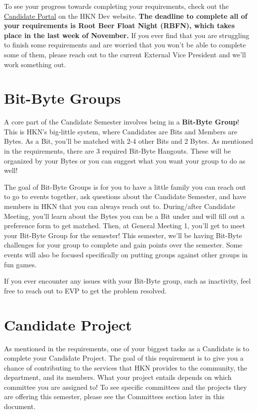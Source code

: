 \documentclass[11pt, article, oneside]{memoir}
\begin{document}
            To see your progress towards completing your requirements, check out the \href{https://hkn.mu/candportal}{Candidate Portal} on the HKN Dev website. \textbf{The deadline to complete all of your requirements is Root Beer Float Night (RBFN), which takes place in the last week of November.} If you ever find that you are struggling to finish some requirements and are worried that you won't be able to complete some of them, please reach out to the current External Vice President and we'll work something out.
    
            \bigbreak


    \section{Bit-Byte Groups}
        A core part of the Candidate Semester involves being in a \textbf{Bit-Byte Group}! This is HKN's big-little system, where Candidates are Bits and Members are Bytes. As a Bit, you'll be matched with 2-4 other Bits and 2 Bytes. As mentioned in the requirements, there are 3 required Bit-Byte Hangouts. These will be organized by your Bytes or you can suggest what you want your group to do as well!
        
        \bigbreak

        The goal of Bit-Byte Groups is for you to have a little family you can reach out to go to events together, ask questions about the Candidate Semester, and have members in HKN that you can always reach out to. During/after Candidate Meeting, you'll learn about the Bytes you can be a Bit under and will fill out a preference form to get matched. Then, at General Meeting 1, you'll get to meet your Bit-Byte Group for the semester! This semester, we'll be having Bit-Byte challenges for your group to complete and gain points over the semester. Some events will also be focused specifically on putting groups against other groups in fun games.
        
        \bigbreak

        If you ever encounter any issues with your Bit-Byte group, such as inactivity, feel free to reach out to EVP to get the problem resolved.

    \section{Candidate Project}
        As mentioned in the requirements, one of your biggest tasks as a Candidate is to complete your Candidate Project. The goal of this requirement is to give you a chance of contributing to the services that HKN provides to the community, the department, and its members. What your project entails depends on which committee you are assigned to! To see specific committees and the projects they are offering this semester, please see the Committees section later in this document.
        
\end{document}
